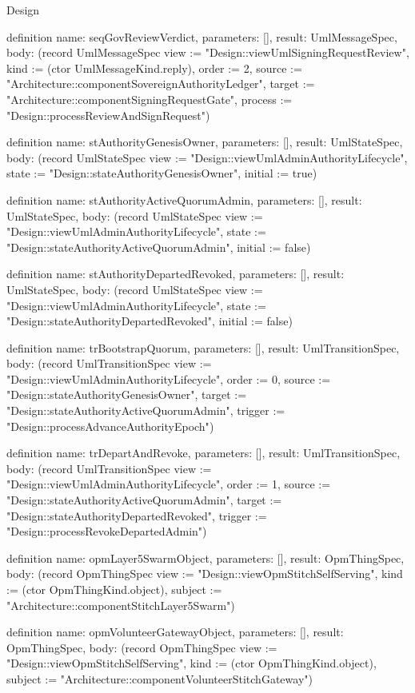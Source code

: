\begin{lexlean}{Design}
\begin{semanticmodule}
definition{
  name: seqGovReviewVerdict,
  parameters: [],
  result: UmlMessageSpec,
  body: (record UmlMessageSpec {view := "Design::viewUmlSigningRequestReview", kind := (ctor UmlMessageKind.reply), order := 2, source := "Architecture::componentSovereignAuthorityLedger", target := "Architecture::componentSigningRequestGate", process := "Design::processReviewAndSignRequest"})
}

definition{
  name: stAuthorityGenesisOwner,
  parameters: [],
  result: UmlStateSpec,
  body: (record UmlStateSpec {view := "Design::viewUmlAdminAuthorityLifecycle", state := "Design::stateAuthorityGenesisOwner", initial := true})
}

definition{
  name: stAuthorityActiveQuorumAdmin,
  parameters: [],
  result: UmlStateSpec,
  body: (record UmlStateSpec {view := "Design::viewUmlAdminAuthorityLifecycle", state := "Design::stateAuthorityActiveQuorumAdmin", initial := false})
}

definition{
  name: stAuthorityDepartedRevoked,
  parameters: [],
  result: UmlStateSpec,
  body: (record UmlStateSpec {view := "Design::viewUmlAdminAuthorityLifecycle", state := "Design::stateAuthorityDepartedRevoked", initial := false})
}

definition{
  name: trBootstrapQuorum,
  parameters: [],
  result: UmlTransitionSpec,
  body: (record UmlTransitionSpec {view := "Design::viewUmlAdminAuthorityLifecycle", order := 0, source := "Design::stateAuthorityGenesisOwner", target := "Design::stateAuthorityActiveQuorumAdmin", trigger := "Design::processAdvanceAuthorityEpoch"})
}

definition{
  name: trDepartAndRevoke,
  parameters: [],
  result: UmlTransitionSpec,
  body: (record UmlTransitionSpec {view := "Design::viewUmlAdminAuthorityLifecycle", order := 1, source := "Design::stateAuthorityActiveQuorumAdmin", target := "Design::stateAuthorityDepartedRevoked", trigger := "Design::processRevokeDepartedAdmin"})
}

definition{
  name: opmLayer5SwarmObject,
  parameters: [],
  result: OpmThingSpec,
  body: (record OpmThingSpec {view := "Design::viewOpmStitchSelfServing", kind := (ctor OpmThingKind.object), subject := "Architecture::componentStitchLayer5Swarm"})
}

definition{
  name: opmVolunteerGatewayObject,
  parameters: [],
  result: OpmThingSpec,
  body: (record OpmThingSpec {view := "Design::viewOpmStitchSelfServing", kind := (ctor OpmThingKind.object), subject := "Architecture::componentVolunteerStitchGateway"})
}


\end{semanticmodule}
\end{lexlean}
